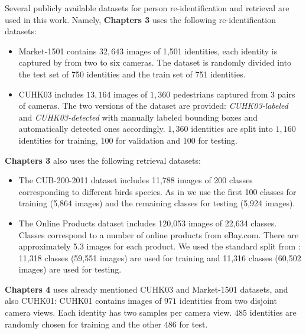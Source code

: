 \documentclass[a4paper, 11pt, oneside]{Thesis}  %
\begin{document}
Several publicly available datasets for person re-identification and retrieval are used in this work.
Namely, \textbf{Chapters 3} uses the following re-identification datasets:
\begin{itemize}
   
\item Market-1501 \citep{zheng2015scalable} contains $32,643$ images of 1,501 identities, each identity is captured by from two to six cameras. The dataset is randomly divided into the test set of 750 identities and the train set of 751 identities. 
 \item CUHK03 \citep{Li14} includes $13,164$ images of $1,360$ pedestrians captured from 3 pairs of cameras. The two versions of the dataset are provided: \textit{CUHK03-labeled} and \textit{CUHK03-detected} with manually labeled bounding boxes and automatically detected ones accordingly.  $1,360$ identities are split into $1,160$ identities for training, $100$ for validation and 100 for testing.
 
 \end{itemize}
\textbf{Chapters 3} also uses the following retrieval datasets:
\begin{itemize}
    \item The CUB-200-2011 dataset includes 11,788 images of 200 classes corresponding to different birds species. As in \citep{Song16} we use the first 100 classes for training
(5,864 images) and the remaining classes for testing
(5,924 images).
\item  The Online Products dataset includes 120,053 images of 22,634 classes. Classes correspond to a number of online products from eBay.com. There are approximately 5.3 images for each product. We used the standard split from \citep{Song16}: 11,318 classes (59,551 images)  are used for training and 11,316 classes (60,502 images) are used for testing.
\end{itemize}

\textbf{Chapters 4} uses already mentioned CUHK03 and Market-1501 datasets, and also CUHK01:
CUHK01 \citep{LiZW12} contains images of $971$ identities from two disjoint camera views. Each identity has two samples per camera view. $485$ identities are randomly chosen for training and the other $486$ for test.  
\end{document}
